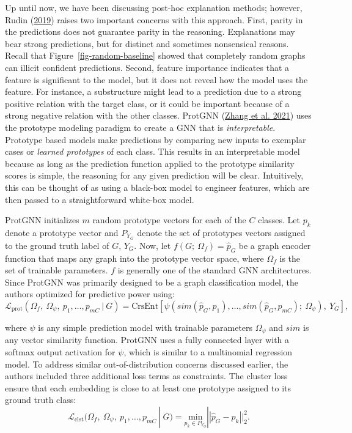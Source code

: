 \documentclass[
  11pt,
  letterpaper,
]{article}
\begin{document}
\quad Up until now, we have been discussing post-hoc explanation
methods; however, Rudin (\protect\hyperlink{ref-Rudin_2019}{2019})
raises two important concerns with this approach. First, parity in the
predictions does not guarantee parity in the reasoning. Explanations may
bear strong predictions, but for distinct and sometimes nonsensical
reasons. Recall that Figure~\ref{fig-random-baseline} showed that
completely random graphs can illicit confident predictions. Second,
feature importance indicates that a feature is significant to the model,
but it does not reveal how the model uses the feature. For instance, a
substructure might lead to a prediction due to a strong positive
relation with the target class, or it could be important because of a
strong negative relation with the other classes. ProtGNN
(\protect\hyperlink{ref-Zhang_Liu_Wang_Lu_Lee_2021}{Zhang et al. 2021})
uses the prototype modeling paradigm to create a GNN that is
\emph{interpretable}. Prototype based models make predictions by
comparing new inputs to exemplar cases or \emph{learned prototypes} of
each class. This results in an interpretable model because as long as
the prediction function applied to the prototype similarity scores is
simple, the reasoning for any given prediction will be clear.
Intuitively, this can be thought of as using a black-box model to
engineer features, which are then passed to a straightforward white-box
model.

\quad ProtGNN initializes \(m\) random prototype vectors for each of the
\(C\) classes. Let \(p_k\) denote a prototype vector and \(P_{Y_G}\)
denote the set of prototypes vectors assigned to the ground truth label
of \(G\), \(Y_G\). Now, let \(f(G; \ \Omega_f) = \hat p_G\) be a graph
encoder function that maps any graph into the prototype vector space,
where \(\Omega_f\) is the set of trainable parameters. \(f\) is
generally one of the standard GNN architectures. Since ProtGNN was
primarily designed to be a graph classification model, the authors
optimized for predictive power using:\\
\begin{equation}
    \mathcal{L}_{\text{prot}}(\Omega_f, \ \Omega_\psi, \ p_1, \dots, p_{mC} \ | \ G)= \text{CrsEnt} \left[\psi \left(sim\left(\hat p_G, p_1\right), \dots, sim\left(\hat p_G, p_{mC}\right); \ \Omega_\psi\right), \ Y_G \right], 
\end{equation}

where \(\psi\) is any simple prediction model with trainable parameters
\(\Omega_\psi\) and \(sim\) is any vector similarity function. ProtGNN
uses a fully connected layer with a softmax output activation for
\(\psi\), which is similar to a multinomial regression model. To address
similar out-of-distribution concerns discussed earlier, the authors
included three additional loss terms as constraints. The cluster loss
ensure that each embedding is close to at least one prototype assigned
to its ground truth class:\\
\begin{equation}
    \mathcal{L}_{\text{clst}}(\Omega_f, \ \Omega_\psi, \ p_1, \dots, p_{mC} \ | \ G) = \underset{p_k \in P_{Y_G}}{\text{min}} || \hat p_G - p_k ||^2_2. 
\end{equation}
\end{document}
